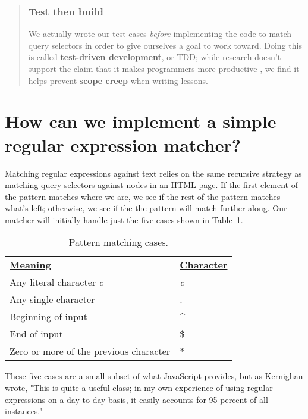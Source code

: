 \documentclass[krantzl]{krantz}
\newcommand{\tblref}[1]{Table~\ref{#1}}
\newcommand{\glossref}[1]{\textbf{#1}}
\newenvironment{callout}{\savenotes\begin{tBox}\begin{quotation}\toggletrue{inbox}\renewcommand{\thempfootnote}{\arabic{footnote}}}{\end{quotation}\vspace{\baselineskip}\end{tBox}\togglefalse{inbox}\spewnotes}
\begin{document}
\begin{callout}


\subsubsection*{Test then build}


We actually wrote our test cases \emph{before} implementing the code to match query selectors
in order to give ourselves a goal to work toward.
Doing this is called \glossref{test-driven development}, or TDD;
while research doesn't support the claim that
it makes programmers more productive \cite{Fucci2016,Fucci2017},
we find it helps prevent \glossref{scope creep} when writing lessons.

\end{callout}

\section{How can we implement a simple regular expression matcher?}\label{pattern-matching-re}


Matching regular expressions against text relies on the same recursive strategy
as matching query selectors against nodes in an HTML page.
If the first element of the pattern matches where we are,
we see if the rest of the pattern matches what's left;
otherwise,
we see if the the pattern will match further along.
Our matcher will initially handle just the five cases shown in
\tblref{pattern-matching-cases}.

\begin{table}
\begin{tabular}{ll}
\textbf{\underline{Meaning}} & \textbf{\underline{Character}} \\
Any literal character \emph{c} & \emph{c} \\
Any single character & . \\
Beginning of input & {\textasciicircum} \\
End of input & \$ \\
Zero or more of the previous character & * \\
\end{tabular}
\caption{Pattern matching cases.}
\label{pattern-matching-cases}
\end{table}



\noindent These five cases are a small subset of what JavaScript provides,
but as Kernighan wrote,
"This is quite a useful class;
in my own experience of using regular expressions on a day-to-day basis,
it easily accounts for 95 percent of all instances."
\end{document}
